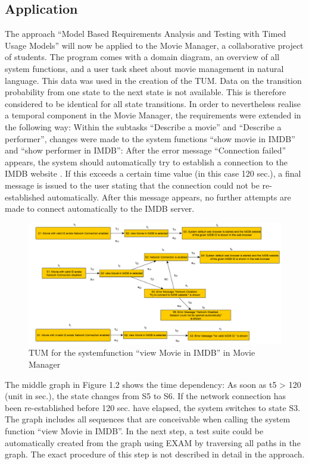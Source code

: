 \subsection{Application}

The approach \enquote{Model Based Requirements Analysis and Testing
with Timed Usage Models} will now be applied to the Movie Manager,
a collaborative project of students. The program comes with a domain
diagram, an overview of all system functions, and a user task sheet
about movie management in natural language. This data was used in
the creation of the TUM. Data on the transition probability from one
state to the next state is not available. This is therefore considered
to be identical for all state transitions. In order to nevertheless
realise a temporal component in the Movie Manager, the requirements
were extended in the following way: Within the subtasks \enquote{Describe
a movie} and \enquote{Describe a performer},
changes were made to the system functions \enquote{show movie
in IMDB} and \enquote{show performer in IMDB}:
After the error message \enquote{Connection failed}
appears, the system should automatically try to establish a connection
to the IMDB website \cite*{imdb}. If this exceeds a certain time
value (in this case 120 sec.), a final message is issued to the user
stating that the connection could not be re-established automatically.
After this message appears, no further attempts are made to connect
automatically to the IMDB server.

\begin{figure}[H]
	\centering
	\includegraphics[scale=0.8]{../images/Application1_MovieManager} 
	\caption{TUM for the systemfunction \enquote{view Movie in IMDB} in Movie Manager}
\end{figure}
The middle graph in Figure 1.2 shows the time dependency: As soon
as t5 \textgreater{} 120 (unit in sec.), the state changes from
S5 to S6. If the network connection has been re-established before
120 sec. have elapsed, the system switches to state S3. The graph
includes all sequences that are conceivable when calling the system
function \enquote{view Movie in IMDB}. In the next
step, a test suite could be automatically created from the graph using
EXAM by traversing all paths in the graph. The exact procedure of
this step is not described in detail in the approach.

